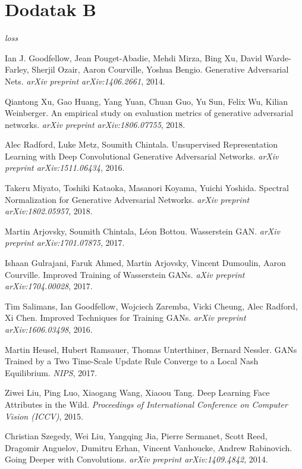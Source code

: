 \documentclass[12pt, a4paper]{article}
\begin{document}
\section*{Dodatak B}
\textit{loss}

\newpage
\begin{thebibliography}{9}
	Ian J. Goodfellow, Jean Pouget-Abadie, Mehdi Mirza, Bing Xu, David Warde-Farley, Sherjil Ozair, Aaron Courville, Yoshua Bengio. Generative Adversarial Nets. \textit{arXiv preprint arXiv:1406.2661}, 2014.
	
	Qiantong Xu, Gao Huang, Yang Yuan, Chuan Guo, Yu Sun, Felix Wu, Kilian Weinberger. An empirical study on evaluation metrics of generative adversarial networks. \textit{arXiv preprint arXiv:1806.07755}, 2018.
	
	Alec Radford, Luke Metz, Soumith Chintala. Unsupervised Representation Learning with Deep Convolutional Generative Adversarial Networks. \textit{arXiv preprint arXiv:1511.06434}, 2016.
	
	Takeru Miyato, Toshiki Kataoka, Masanori Koyama, Yuichi Yoshida. Spectral Normalization for Generative Adversarial Networks. \textit{arXiv preprint arXiv:1802.05957}, 2018.
	
	Martin Arjovsky, Soumith Chintala, Léon Bottou. Wasserstein GAN. \textit{arXiv preprint arXiv:1701.07875}, 2017.
	
	Ishaan Gulrajani, Faruk Ahmed, Martin Arjovsky, Vincent Dumoulin, Aaron Courville. Improved Training of Wasserstein GANs. \textit{aXiv preprint arXiv:1704.00028}, 2017.
	
	Tim Salimans, Ian Goodfellow, Wojciech Zaremba, Vicki Cheung, Alec Radford, Xi Chen. Improved Techniques for Training GANs. \textit{arXiv preprint arXiv:1606.03498}, 2016.
	
	Martin Heusel, Hubert Ramsauer, Thomas Unterthiner, Bernard Nessler. GANs Trained by a Two Time-Scale Update Rule
	Converge to a Local Nash Equilibrium. \textit{NIPS}, 2017.
	
	Ziwei Liu, Ping Luo, Xiaogang Wang, Xiaoou Tang. Deep Learning Face Attributes in the Wild. \textit{Proceedings of International Conference on Computer Vision (ICCV)}, 2015.
	
	Christian Szegedy, Wei Liu, Yangqing Jia, Pierre Sermanet, Scott Reed, Dragomir Anguelov, Dumitru Erhan, Vincent Vanhoucke, Andrew Rabinovich. Going Deeper with Convolutions. \textit{arXiv preprint arXiv:1409.4842}, 2014.
	

\end{thebibliography}
\end{document}
